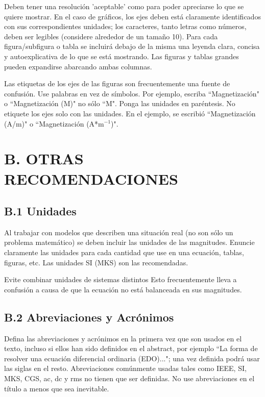 \documentclass[a4paper, 10pt, conference]{ieeeconf}      %
\begin{document}
Deben tener una resoluci\'on 'aceptable' como para poder apreciarse lo que se quiere mostrar. En el caso de gr\'aficos, los ejes deben est\'a claramente identificados con sus correspondientes unidades; los caracteres, tanto letras como n\'umeros, deben ser legibles (considere alrededor de un tama\~no 10). Para cada figura/subfigura o tabla se incluir\'a debajo de la misma una leyenda clara, concisa y autoexplicativa de lo que se est\'a mostrando. Las figuras y tablas grandes pueden expandirse abarcando ambas columnas.  

Las etiquetas de los ejes de las figuras son frecuentemente una fuente de confusi\'on.  Use palabras en vez de s\'imbolos. Por ejemplo, escriba ``Magnetizaci\'on" o ``Magnetizaci\'on (M)" no s\'olo ``M".  Ponga las unidades en par\'entesis.  No etiquete los ejes solo con las unidades.  En el ejemplo, se escribi\'o ``Magnetizaci\'on (A/m)" o ``Magnetizaci\'on (A*m$^{-1}$)".  

\section*{B.  OTRAS RECOMENDACIONES}
 
\subsection*{B.1		Unidades}

Al trabajar con modelos que describen una situaci\'on real (no son s\'olo un problema matem\'atico) se deben incluir las unidades de las magnitudes. Enuncie claramente las unidades para cada cantidad que use en una ecuaci\'on, tablas, figuras, etc. Las unidades SI (MKS) son las recomendadas.

Evite combinar unidades de sistemas distintos Esto frecuentemente lleva a confusi\'on a causa de que la ecuaci\'on no est\'a balanceada en sus magnitudes. 

\subsection*{B.2		Abreviaciones y Acr\'onimos}

Defina las abreviaciones y acr\'onimos en la primera vez que son usados en el texto, incluso si ellos han sido definidos en el abstract, por ejemplo ``La forma de resolver una ecuaci\'on diferencial ordinaria (EDO)..."; una vez definida podr\'a usar las siglas en el resto.  Abreviaciones com\'unmente usadas tales como IEEE, SI, MKS, CGS, ac, dc y rms no tienen que ser definidas.  No use abreviaciones en el t\'itulo a menos que sea inevitable.
\end{document}
